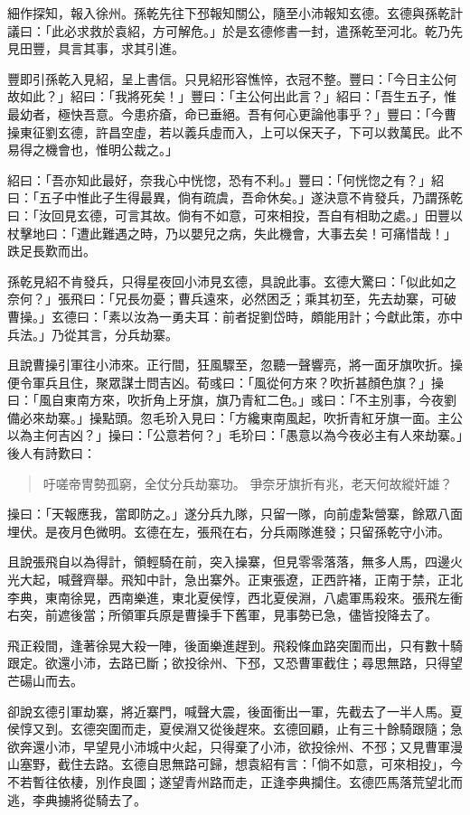 細作探知，報入徐州。孫乾先往下邳報知關公，隨至小沛報知玄德。玄德與孫乾計議曰：「此必求救於袁紹，方可解危。」於是玄德修書一封，遣孫乾至河北。乾乃先見田豐，具言其事，求其引進。

豐即引孫乾入見紹，呈上書信。只見紹形容憔悴，衣冠不整。豐曰：「今日主公何故如此？」紹曰：「我將死矣！」豐曰：「主公何出此言？」紹曰：「吾生五子，惟最幼者，極快吾意。今患疥瘡，命已垂絕。吾有何心更論他事乎？」豐曰：「今曹操東征劉玄德，許昌空虛，若以義兵虛而入，上可以保天子，下可以救萬民。此不易得之機會也，惟明公裁之。」

紹曰：「吾亦知此最好，奈我心中恍惚，恐有不利。」豐曰：「何恍惚之有？」紹曰：「五子中惟此子生得最異，倘有疏虞，吾命休矣。」遂決意不肯發兵，乃謂孫乾曰：「汝回見玄德，可言其故。倘有不如意，可來相投，吾自有相助之處。」田豐以杖擊地曰：「遭此難遇之時，乃以嬰兒之病，失此機會，大事去矣！可痛惜哉！」跌足長歎而出。

孫乾見紹不肯發兵，只得星夜回小沛見玄德，具說此事。玄德大驚曰：「似此如之奈何？」張飛曰：「兄長勿憂；曹兵遠來，必然困乏；乘其初至，先去劫寨，可破曹操。」玄德曰：「素以汝為一勇夫耳：前者捉劉岱時，頗能用計；今獻此策，亦中兵法。」乃從其言，分兵劫寨。

且說曹操引軍往小沛來。正行間，狂風驟至，忽聽一聲響亮，將一面牙旗吹折。操便令軍兵且住，聚眾謀士問吉凶。荀彧曰：「風從何方來？吹折甚顏色旗？」操曰：「風自東南方來，吹折角上牙旗，旗乃青紅二色。」彧曰：「不主別事，今夜劉備必來劫寨。」操點頭。忽毛玠入見曰：「方纔東南風起，吹折青紅牙旗一面。主公以為主何吉凶？」操曰：「公意若何？」毛玠曰：「愚意以為今夜必主有人來劫寨。」後人有詩歎曰：

\begin{quote}
吁嗟帝冑勢孤窮，全仗分兵劫寨功。
爭奈牙旗折有兆，老天何故縱奸雄？
\end{quote}

操曰：「天報應我，當即防之。」遂分兵九隊，只留一隊，向前虛紮營寨，餘眾八面埋伏。是夜月色微明。玄德在左，張飛在右，分兵兩隊進發；只留孫乾守小沛。

且說張飛自以為得計，領輕騎在前，突入操寨，但見零零落落，無多人馬，四邊火光大起，喊聲齊舉。飛知中計，急出寨外。正東張遼，正西許褚，正南于禁，正北李典，東南徐晃，西南樂進，東北夏侯惇，西北夏侯淵，八處軍馬殺來。張飛左衝右突，前遮後當；所領軍兵原是曹操手下舊軍，見事勢已急，儘皆投降去了。

飛正殺間，逢著徐晃大殺一陣，後面樂進趕到。飛殺條血路突圍而出，只有數十騎跟定。欲還小沛，去路已斷；欲投徐州、下邳，又恐曹軍截住；尋思無路，只得望芒碭山而去。

卻說玄德引軍劫寨，將近寨門，喊聲大震，後面衝出一軍，先截去了一半人馬。夏侯惇又到。玄德突圍而走，夏侯淵又從後趕來。玄德回顧，止有三十餘騎跟隨；急欲奔還小沛，早望見小沛城中火起，只得棄了小沛，欲投徐州、不邳；又見曹軍漫山塞野，截住去路。玄德自思無路可歸，想袁紹有言：「倘不如意，可來相投」，今不若暫往依棲，別作良圖；遂望青州路而走，正逢李典攔住。玄德匹馬落荒望北而逃，李典擄將從騎去了。

